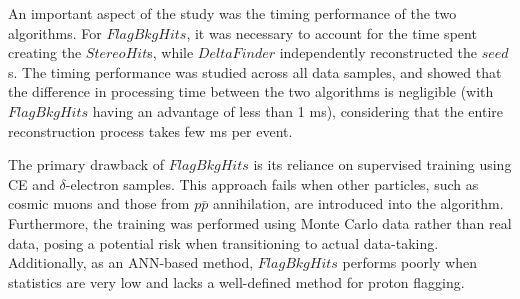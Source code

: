 An important aspect of the study was the 
timing performance of the two algorithms. 
For $FlagBkgHits$, it was necessary to 
account for the time spent creating the $StereoHit$s, 
while $DeltaFinder$ independently reconstructed 
the $seed$s. The timing performance was 
studied across all data samples, and showed that 
the difference in processing time between 
the two algorithms is negligible (with 
$FlagBkgHits$ having an advantage of less than 1 ms), 
considering that the entire reconstruction 
process takes few ms per event.

The primary drawback of $FlagBkgHits$ is its 
reliance on supervised training using 
CE and $\delta$-electron samples. This 
approach fails when other particles, such 
as cosmic muons and those from $p\bar{p}$ 
annihilation, are introduced into the algorithm. 
Furthermore, the training was performed using 
Monte Carlo data rather than real data, 
posing a potential risk when transitioning 
to actual data-taking. Additionally, as an 
ANN-based method, $FlagBkgHits$ performs 
poorly when statistics are very low and lacks 
a well-defined method for proton flagging.
